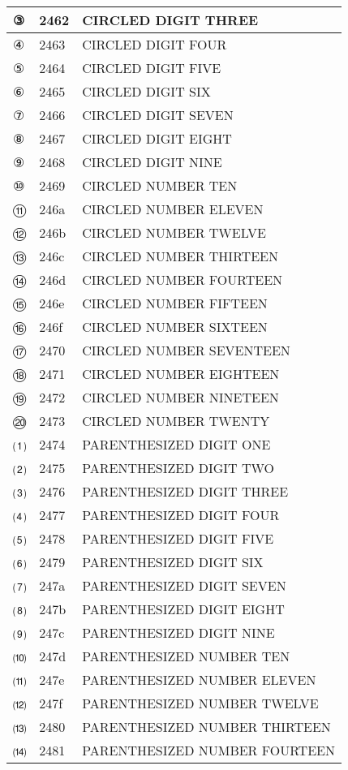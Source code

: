 \documentclass[12pt,letterpaper,openany]{book}
\begin{document}
\begin{center}
\begin{supertabular}{|m{0.25in}|m{0.5in}|m{4in}|}
③ & 2462 & CIRCLED DIGIT THREE\\\hline
④ & 2463 & CIRCLED DIGIT FOUR\\\hline
⑤ & 2464 & CIRCLED DIGIT FIVE\\\hline
⑥ & 2465 & CIRCLED DIGIT SIX\\\hline
⑦ & 2466 & CIRCLED DIGIT SEVEN\\\hline
⑧ & 2467 & CIRCLED DIGIT EIGHT\\\hline
⑨ & 2468 & CIRCLED DIGIT NINE\\\hline
⑩ & 2469 & CIRCLED NUMBER TEN\\\hline
⑪ & 246a & CIRCLED NUMBER ELEVEN\\\hline
⑫ & 246b & CIRCLED NUMBER TWELVE\\\hline
⑬ & 246c & CIRCLED NUMBER THIRTEEN\\\hline
⑭ & 246d & CIRCLED NUMBER FOURTEEN\\\hline
⑮ & 246e & CIRCLED NUMBER FIFTEEN\\\hline
⑯ & 246f & CIRCLED NUMBER SIXTEEN\\\hline
⑰ & 2470 & CIRCLED NUMBER SEVENTEEN\\\hline
⑱ & 2471 & CIRCLED NUMBER EIGHTEEN\\\hline
⑲ & 2472 & CIRCLED NUMBER NINETEEN\\\hline
⑳ & 2473 & CIRCLED NUMBER TWENTY\\\hline
⑴ & 2474 & PARENTHESIZED DIGIT ONE\\\hline
⑵ & 2475 & PARENTHESIZED DIGIT TWO\\\hline
⑶ & 2476 & PARENTHESIZED DIGIT THREE\\\hline
⑷ & 2477 & PARENTHESIZED DIGIT FOUR\\\hline
⑸ & 2478 & PARENTHESIZED DIGIT FIVE\\\hline
⑹ & 2479 & PARENTHESIZED DIGIT SIX\\\hline
⑺ & 247a & PARENTHESIZED DIGIT SEVEN\\\hline
⑻ & 247b & PARENTHESIZED DIGIT EIGHT\\\hline
⑼ & 247c & PARENTHESIZED DIGIT NINE\\\hline
⑽ & 247d & PARENTHESIZED NUMBER TEN\\\hline
⑾ & 247e & PARENTHESIZED NUMBER ELEVEN\\\hline
⑿ & 247f & PARENTHESIZED NUMBER TWELVE\\\hline
⒀ & 2480 & PARENTHESIZED NUMBER THIRTEEN\\\hline
⒁ & 2481 & PARENTHESIZED NUMBER FOURTEEN\\\hline

\end{supertabular}
\end{center}
\end{document}
